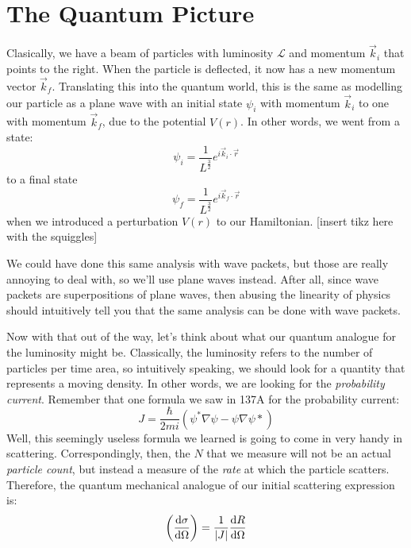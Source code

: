 \section{The Quantum Picture}
Clasically, we have a beam of particles with luminosity $\mathcal L$ and momentum $\vec k_i$ that points to the
right. When the particle is deflected, it now has a new momentum vector $\vec k_f$. Translating this into the
quantum world, this is the same as modelling our particle as a plane wave with an initial state $\psi_i$ with 
momentum $\vec k_i$ to one with momentum $\vec k_f$, due to the potential $V(r)$. In other words, we went from a state: 
\[
	\psi_i = \frac{1}{L^{\frac{3}{2}}}e^{i\vec k_i \cdot \vec r}
\] 
to a final state 
\[
	\psi_f = \frac{1}{L^{\frac{3}{2}}}e^{i \vec k_f \cdot \vec r}
\] 
when we introduced a perturbation $V(r)$ to our Hamiltonian.
[insert tikz here with the squiggles]
\begin{insight*}{}{}
	We could have done this same analysis with wave packets, but those are really annoying to deal with, so 
	we'll use plane waves instead. After all, since wave packets are superpositions of plane waves, then 
	abusing the linearity of physics should intuitively tell you that the same analysis can be done with 
	wave packets. 
\end{insight*}
Now with that out of the way, let's think about what our quantum analogue for the luminosity might be. 
Classically, the luminosity refers to the number of particles per time area, so intuitively speaking, we should
look for a quantity that represents a moving density. In other words, we are looking for the \textit{probability
current}. Remember that one formula we saw in 137A for the probability current:
\[
J = \frac{\hbar}{2mi}\left( \psi^*\nabla \psi - \psi \nabla\psi* \right) 
\] 
Well, this seemingly useless formula we learned is going to come in very handy in scattering. Correspondingly, 
then, the $N$ that we measure will not be an actual \textit{particle count}, but instead a measure of the 
\textit{rate} at which the particle scatters. Therefore, the quantum mechanical analogue of our initial 
scattering expression is: 
\[
	\left( \dv{\sigma}{\Omega}\right) = \frac{1}{|J|}\dv{R}{\Omega} 
\] 
